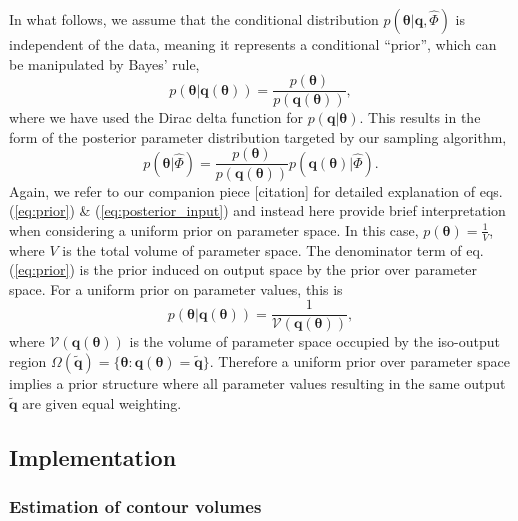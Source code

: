 In what follows, we assume that the conditional distribution $p(\boldsymbol{\theta}|\boldsymbol{q}, \hat{\Phi})$ is independent of the data, meaning it represents a conditional ``prior'', which can be manipulated by Bayes' rule,
%
\begin{equation}\label{eq:prior}
p(\boldsymbol{\theta}|\boldsymbol{q}(\boldsymbol{\theta})) = \frac{p(\boldsymbol{\theta})}{p(\boldsymbol{q}(\boldsymbol{\theta}))},
\end{equation}
%
where we have used the Dirac delta function for $p(\boldsymbol{q}|\boldsymbol{\theta})$. This results in the form of the posterior parameter distribution targeted by our sampling algorithm,
%
\begin{equation}\label{eq:posterior_input}
p(\boldsymbol{\theta}|\hat{\Phi}) = \frac{p(\boldsymbol{\theta})}{p(\boldsymbol{q}(\boldsymbol{\theta}))} p(\boldsymbol{q}(\boldsymbol{\theta})|\hat{\Phi}).
\end{equation}
%
Again, we refer to our companion piece [citation] for detailed explanation of eqs. (\ref{eq:prior}) \& (\ref{eq:posterior_input}) and instead here provide brief interpretation when considering a uniform prior on parameter space. In this case, $p(\boldsymbol{\theta}) = \frac{1}{V}$, where $V$ is the total volume of parameter space. The denominator term of eq. (\ref{eq:prior}) is the prior induced on output space by the prior over parameter space. For a uniform prior on parameter values, this is %
%
\begin{equation}\label{eq:contour_volume}
p(\boldsymbol{\theta}|\boldsymbol{q}(\boldsymbol{\theta})) = \frac{1}{\mathcal{V}(\boldsymbol{q}(\boldsymbol{\theta}))},
\end{equation}
%
where $\mathcal{V}(\boldsymbol{q}(\boldsymbol{\theta}))$ is the volume of parameter space occupied by the iso-output region $\Omega(\tilde{\boldsymbol{q}}) = \{\boldsymbol{\theta}: \boldsymbol{q}(\boldsymbol{\theta}) = \tilde{\boldsymbol{q}}\}$. Therefore a uniform prior over parameter space implies a prior structure where all  parameter values resulting in the same output $\tilde{\boldsymbol{q}}$ are given equal weighting.

\subsection{Implementation}

\subsubsection{Estimation of contour volumes}

